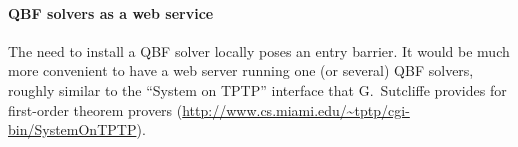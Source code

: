 \paragraph{QBF solvers as a web service}

The need to install a QBF solver locally poses an entry barrier.  It
would be much more convenient to have a web server running one (or
several) QBF solvers, roughly similar to the ``System on TPTP''
interface that G.~Sutcliffe provides for first-order theorem provers
(\url{http://www.cs.miami.edu/~tptp/cgi-bin/SystemOnTPTP}).


